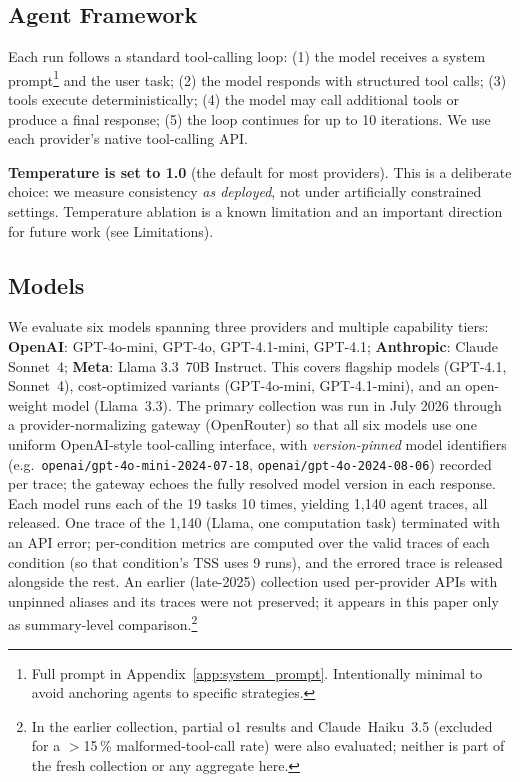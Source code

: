 \documentclass[11pt]{article}
\newcommand{\tss}{\mathrm{TSS}}
\begin{document}
\subsection{Agent Framework}

Each run follows a standard tool-calling loop: (1) the model receives a system
prompt\footnote{Full prompt in Appendix~\ref{app:system_prompt}. Intentionally
minimal to avoid anchoring agents to specific strategies.} and the user task;
(2) the model responds with structured tool calls; (3) tools execute
deterministically; (4) the model may call additional tools or produce a final
response; (5) the loop continues for up to 10 iterations. We use each provider's
native tool-calling API.

\textbf{Temperature is set to 1.0} (the default for most providers). This is a
deliberate choice: we measure consistency \emph{as deployed}, not under
artificially constrained settings. Temperature ablation is a known limitation and
an important direction for future work (see Limitations).

\subsection{Models}
\label{sec:models}

We evaluate six models spanning three providers and multiple capability tiers:
\textbf{OpenAI}: GPT-4o-mini, GPT-4o, GPT-4.1-mini, GPT-4.1;
\textbf{Anthropic}: Claude Sonnet~4;
\textbf{Meta}: Llama 3.3~70B Instruct.
This covers flagship models (GPT-4.1, Sonnet~4), cost-optimized variants
(GPT-4o-mini, GPT-4.1-mini), and an open-weight model (Llama~3.3).
The primary collection was run in July 2026 through a provider-normalizing
gateway (OpenRouter) so that all six models use one uniform OpenAI-style
tool-calling interface, with \emph{version-pinned} model identifiers
(e.g.\ \texttt{openai/gpt-4o-mini-2024-07-18},
\texttt{openai/gpt-4o-2024-08-06}) recorded per trace; the gateway echoes the
fully resolved model version in each response. Each model runs each of the 19
tasks 10 times, yielding 1,140 agent traces, all released. One trace of the
1,140 (Llama, one computation task) terminated with an API error; per-condition
metrics are computed over the valid traces of each condition (so that
condition's $\tss$ uses 9 runs), and the errored trace is released alongside
the rest. An earlier
(late-2025) collection used per-provider APIs with unpinned aliases and its
traces were not preserved; it appears in this paper only as summary-level
comparison.\footnote{In the earlier collection, partial o1 results and
Claude~Haiku~3.5 (excluded for a $>$15\,\% malformed-tool-call rate) were also
evaluated; neither is part of the fresh collection or any aggregate here.}
\end{document}
